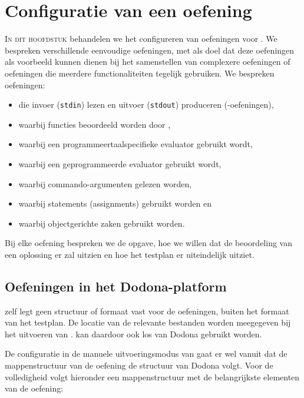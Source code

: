 \chapter{Configuratie van een oefening}\label{ch:nieuwe-oefening}

\lettrine{I}{n dit hoofdstuk} behandelen we het configureren van oefeningen voor \tested{}.
We bespreken verschillende eenvoudige oefeningen, met als doel dat deze oefeningen als voorbeeld kunnen dienen bij het samenstellen van complexere oefeningen of oefeningen die meerdere functionaliteiten tegelijk gebruiken.
We bespreken oefeningen:

\begin{itemize}
    \item die invoer (\texttt{stdin}) lezen en uitvoer (\texttt{stdout}) produceren (-oefeningen),
    \item waarbij functies beoordeeld worden door \tested{},
    \item waarbij een programmeertaalspecifieke evaluator gebruikt wordt,
    \item waarbij een geprogrammeerde evaluator gebruikt wordt,
    \item waarbij commando-argumenten gelezen worden,
    \item waarbij statements (assignments) gebruikt worden en
    \item waarbij objectgerichte zaken gebruikt worden.
\end{itemize}

Bij elke oefening bespreken we de opgave, hoe we willen dat de beoordeling van een oplossing er zal uitzien en hoe het testplan er uiteindelijk uitziet.

\section{Oefeningen in het Dodona-platform}\label{sec:oefeningen-in-het-dodona-platform}

\tested{} zelf legt geen structuur of formaat vast voor de oefeningen, buiten het formaat van het testplan.
De locatie van de relevante bestanden worden meegegeven bij het uitvoeren van \tested{}.
\tested{} kan daardoor ook los van Dodona gebruikt worden.

De configuratie in de manuele uitvoeringsmodus van \tested{} gaat er wel vanuit dat de mappenstructuur van de oefening de structuur van Dodona volgt.
Voor de volledigheid volgt hieronder een mappenstructuur met de belangrijkste elementen van de oefening:

